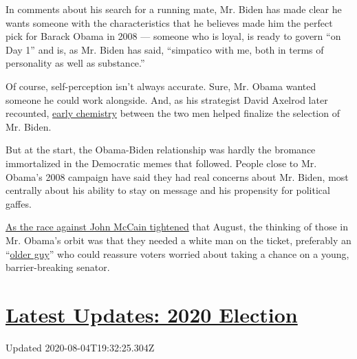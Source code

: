 In comments about his search for a running mate, Mr. Biden has made
clear he wants someone with the characteristics that he believes made
him the perfect pick for Barack Obama in 2008 --- someone who is loyal,
is ready to govern ``on Day 1'' and is, as Mr. Biden has said,
``simpatico with me, both in terms of personality as well as
substance.''

Of course, self-perception isn't always accurate. Sure, Mr. Obama wanted
someone he could work alongside. And, as his strategist David Axelrod
later recounted,
\href{https://www.usatoday.com/story/news/politics/onpolitics/2015/02/10/biden-vice-president-bayh-axelrod/81211852/}{early
chemistry} between the two men helped finalize the selection of Mr.
Biden.

But at the start, the Obama-Biden relationship was hardly the bromance
immortalized in the Democratic memes that followed. People close to Mr.
Obama's 2008 campaign have said they had real concerns about Mr. Biden,
most centrally about his ability to stay on message and his propensity
for political gaffes.

\href{https://blogs.wsj.com/washwire/2008/08/13/mccain-obama-race-enters-dead-heat/}{As
the race against John McCain tightened} that August, the thinking of
those in Mr. Obama's orbit was that they needed a white man on the
ticket, preferably an
``\href{https://www.nytimes.com/2019/08/16/us/politics/biden-obama-history.html}{older
guy}'' who could reassure voters worried about taking a chance on a
young, barrier-breaking senator.

\hypertarget{latest-updates-2020-election}{%
\section{\texorpdfstring{\href{https://www.nytimes.com/2020/08/04/us/elections/primary-election-michigan-arizona-kansas.html?action=click\&pgtype=Article\&state=default\&region=MAIN_CONTENT_1\&context=storylines_live_updates}{Latest
Updates: 2020
Election}}{Latest Updates: 2020 Election}}\label{latest-updates-2020-election}}

Updated 2020-08-04T19:32:25.304Z

